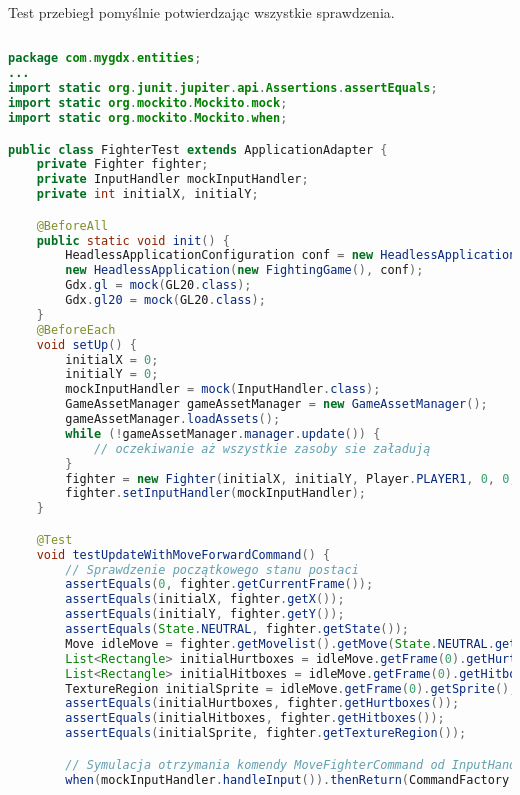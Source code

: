 Test przebiegł pomyślnie potwierdzając wszystkie sprawdzenia.
\begin{lstlisting}[language=Java,style=JavaStyle,label=list:FighterTest,caption=Test metody \texttt{update} z klasy \texttt{Fighter},
                   basicstyle=\footnotesize\ttfamily]
							
package com.mygdx.entities;
...
import static org.junit.jupiter.api.Assertions.assertEquals;
import static org.mockito.Mockito.mock;
import static org.mockito.Mockito.when;

public class FighterTest extends ApplicationAdapter {
    private Fighter fighter;
    private InputHandler mockInputHandler;
    private int initialX, initialY;

    @BeforeAll
    public static void init() {
        HeadlessApplicationConfiguration conf = new HeadlessApplicationConfiguration();
        new HeadlessApplication(new FightingGame(), conf);
        Gdx.gl = mock(GL20.class);
        Gdx.gl20 = mock(GL20.class);
    }
    @BeforeEach
    void setUp() {
        initialX = 0;
        initialY = 0;
        mockInputHandler = mock(InputHandler.class);
        GameAssetManager gameAssetManager = new GameAssetManager();
        gameAssetManager.loadAssets();
        while (!gameAssetManager.manager.update()) {
            // oczekiwanie aż wszystkie zasoby sie załadują
        }
        fighter = new Fighter(initialX, initialY, Player.PLAYER1, 0, 0, 0, 0, 10, gameAssetManager.manager);
        fighter.setInputHandler(mockInputHandler);
    }

    @Test
    void testUpdateWithMoveForwardCommand() {
        // Sprawdzenie początkowego stanu postaci
        assertEquals(0, fighter.getCurrentFrame());
        assertEquals(initialX, fighter.getX());
        assertEquals(initialY, fighter.getY());
        assertEquals(State.NEUTRAL, fighter.getState());
        Move idleMove = fighter.getMovelist().getMove(State.NEUTRAL.getId());
        List<Rectangle> initialHurtboxes = idleMove.getFrame(0).getHurtboxes();
        List<Rectangle> initialHitboxes = idleMove.getFrame(0).getHitboxes();
        TextureRegion initialSprite = idleMove.getFrame(0).getSprite();
        assertEquals(initialHurtboxes, fighter.getHurtboxes());
        assertEquals(initialHitboxes, fighter.getHitboxes());
        assertEquals(initialSprite, fighter.getTextureRegion());

        // Symulacja otrzymania komendy MoveFighterCommand od InputHandler'a
        when(mockInputHandler.handleInput()).thenReturn(CommandFactory.moveFighterCommandForward(fighter));


\end{lstlisting}

